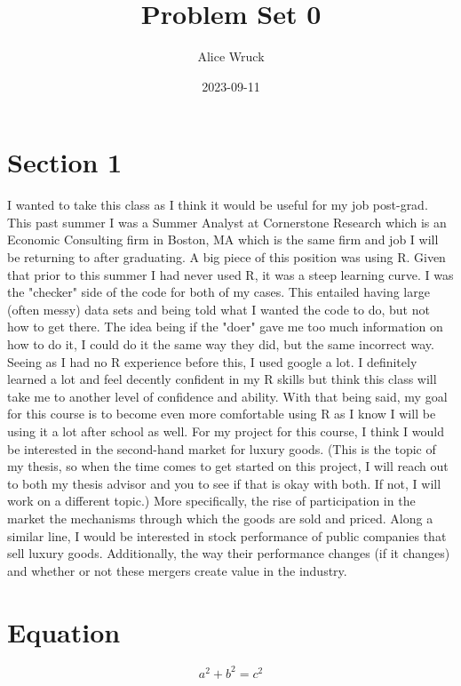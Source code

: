 \documentclass{article}
\title{Problem Set 0}
\author{Alice Wruck}
\date{2023-09-11}
\begin{document}
\maketitle

\section{Section 1}
I wanted to take this class as I think it would be useful for my job post-grad. This past summer I was a Summer Analyst at Cornerstone Research which is an Economic Consulting firm in Boston, MA which is the same firm and job I will be returning to after graduating. A big piece of this position was using R. Given that prior to this summer I had never used R, it was a steep learning curve. I was the "checker" side of the code for both of my cases. This entailed having large (often messy) data sets and being told what I wanted the code to do, but not how to get there. The idea being if the "doer" gave me too much information on how to do it, I could do it the same way they did, but the same incorrect way. Seeing as I had no R experience before this, I used google a lot. I definitely learned a lot and feel decently confident in my R skills but think this class will take me to another level of confidence and ability. With that being said, my goal for this course is to become even more comfortable using R as I know I will be using it a lot after school as well. For my project for this course, I think I would be interested in the second-hand market for luxury goods. (This is the topic of my thesis, so when the time comes to get started on this project, I will reach out to both my thesis advisor and you to see if that is okay with both. If not, I will work on a different topic.) More specifically, the rise of participation in the market the mechanisms through which the goods are sold and priced. Along a similar line, I would be interested in stock performance of public companies that sell luxury goods. Additionally, the way their performance changes (if it changes) and whether or not these mergers create value in the industry. 


\section{Equation}

\[a^2 + b^2 = c^2 \]
\end{document}

